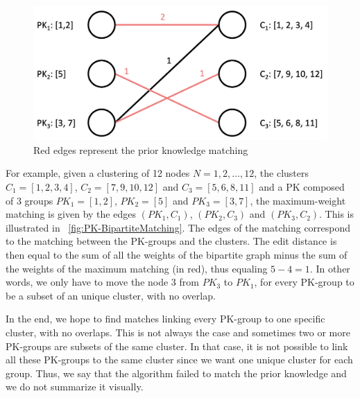 \begin{figure}
\centering
\includegraphics[width=\linewidth]{static/figures/PK-Clustering/VISPaperFigures/bipartiteMatching.png}
\caption{Red edges represent the prior knowledge matching}
\label{fig:PK-BipartiteMatching}
\end{figure}
For example, given a clustering of 12 nodes $N = {1,2, \ldots, 12}$, the clusters $C_1 = [1,2,3,4]$, $C_2 = [7,9,10,12]$ and $C_3 = [5,6,8,11]$ and a PK composed of 3 groups $PK_1 = [1,2]$, $PK_2 = [5]$ and $PK_3 = [3,7]$, the maximum-weight matching is given by the edges $(PK_1, C_1)$, $(PK_2, C_3)$ and $(PK_3, C_2)$. This is illustrated in ~\autoref{fig:PK-BipartiteMatching}. The edges of the matching correspond to the matching between the PK-groups and the clusters. The edit distance is then equal to the sum of all the weights of the bipartite graph minus the sum of the weights of the maximum matching (in red), thus equaling $5 - 4 = 1$. In other words, we only have to move the node 3 from $PK_3$ to $PK_1$, for every PK-group to be a subset of an unique cluster, with no overlap.




In the end, we hope to find matches linking every PK-group to one specific cluster, with no overlaps. This is not always the case and sometimes two or more PK-groups are subsets of the same cluster. In that case, it is not possible to link all these PK-groups to the same cluster since we want one unique cluster for each group. Thus, we say that the algorithm failed to match the prior knowledge and we do not summarize it visually.

